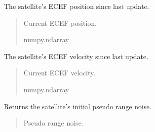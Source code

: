 \documentclass[letterpaper,10pt,english]{sphinxmanual}
\begin{document}
\begin{fulllineitems}
\begin{fulllineitems}
\label{\detokenize{modules/gps/satellite:qnav.gps.satellite.Satellite.position}}
\pysigstartsignatures
{}
\pysigstopsignatures
\sphinxAtStartPar
The satellite’s ECEF position since last update.
\begin{quote}\begin{description}
\sphinxAtStartPar
Current ECEF position.

\sphinxAtStartPar
numpy.ndarray

\end{description}\end{quote}

\end{fulllineitems}


\begin{fulllineitems}
\label{\detokenize{modules/gps/satellite:qnav.gps.satellite.Satellite.velocity}}
\pysigstartsignatures
{}
\pysigstopsignatures
\sphinxAtStartPar
The satellite’s ECEF velocity since last update.
\begin{quote}\begin{description}
\sphinxAtStartPar
Current ECEF velocity.

\sphinxAtStartPar
numpy.ndarray

\end{description}\end{quote}

\end{fulllineitems}


\begin{fulllineitems}
\label{\detokenize{modules/gps/satellite:qnav.gps.satellite.Satellite.pseudo_range_noise}}
\pysigstartsignatures
{}
\pysigstopsignatures
\sphinxAtStartPar
Returns the satellite’s initial pseudo range noise.
\begin{quote}\begin{description}
\sphinxAtStartPar
Pseudo range noise.


\end{description}
\end{quote}
\end{fulllineitems}
\end{fulllineitems}
\end{document}
